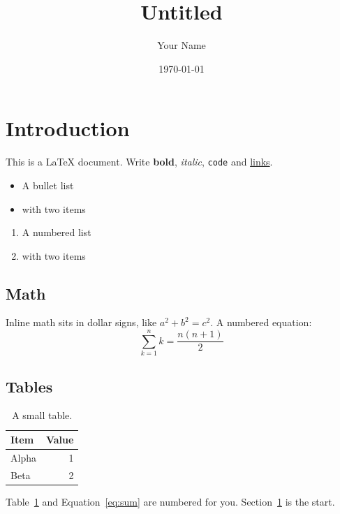 \documentclass[11pt]{article}
\title{Untitled}
\author{Your Name}
\date{\today}
\begin{document}
\maketitle

\section{Introduction}\label{sec:intro}
This is a LaTeX document. Write \textbf{bold}, \emph{italic}, \texttt{code} and
\href{https://www.overleaf.com/learn}{links}.

\begin{itemize}
  \item A bullet list
  \item with two items
\end{itemize}

\begin{enumerate}
  \item A numbered list
  \item with two items
\end{enumerate}

\subsection{Math}
Inline math sits in dollar signs, like $a^2 + b^2 = c^2$. A numbered equation:
\begin{equation}\label{eq:sum}
  \sum_{k=1}^{n} k = \frac{n(n + 1)}{2}
\end{equation}

\subsection{Tables}
\begin{table}[h]
  \centering
  \begin{tabular}{lr}
    Item & Value \\
    \hline
    Alpha & 1 \\
    Beta & 2 \\
  \end{tabular}
  \caption{A small table.}\label{tab:items}
\end{table}

Table~\ref{tab:items} and Equation~\ref{eq:sum} are numbered for you.
Section~\ref{sec:intro} is the start.
\end{document}
